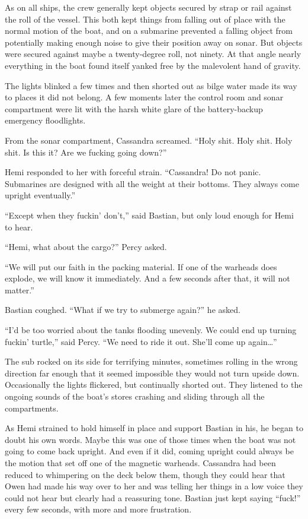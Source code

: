 \documentclass[
]{scrbook}
\begin{document}
As on all ships, the crew generally kept objects secured by strap or
rail against the roll of the vessel. This both kept things from falling
out of place with the normal motion of the boat, and on a submarine
prevented a falling object from potentially making enough noise to give
their position away on sonar. But objects were secured against maybe a
twenty-degree roll, not ninety. At that angle nearly everything in the
boat found itself yanked free by the malevolent hand of gravity.

The lights blinked a few times and then shorted out as bilge water made
its way to places it did not belong. A few moments later the control
room and sonar compartment were lit with the harsh white glare of the
battery-backup emergency floodlights.

From the sonar compartment, Cassandra screamed. ``Holy shit. Holy shit.
Holy shit. Is this it? Are we fucking going down?''

Hemi responded to her with forceful strain. ``Cassandra! Do not panic.
Submarines are designed with all the weight at their bottoms. They
always come upright eventually.''

``Except when they fuckin' don't,'' said Bastian, but only loud enough
for Hemi to hear.

``Hemi, what about the cargo?'' Percy asked.

``We will put our faith in the packing material. If one of the warheads
does explode, we will know it immediately. And a few seconds after that,
it will not matter.''

Bastian coughed. ``What if we try to submerge again?'' he asked.

``I'd be too worried about the tanks flooding unevenly. We could end up
turning fuckin' turtle,'' said Percy. ``We need to ride it out. She'll
come up again\ldots{}''

The sub rocked on its side for terrifying minutes, sometimes rolling in
the wrong direction far enough that it seemed impossible they would not
turn upside down. Occasionally the lights flickered, but continually
shorted out. They listened to the ongoing sounds of the boat's stores
crashing and sliding through all the compartments.

As Hemi strained to hold himself in place and support Bastian in his, he
began to doubt his own words. Maybe this was one of those times when the
boat was not going to come back upright. And even if it did, coming
upright could always be the motion that set off one of the magnetic
warheads. Cassandra had been reduced to whimpering on the deck below
them, though they could hear that Owen had made his way over to her and
was telling her things in a low voice they could not hear but clearly
had a reassuring tone. Bastian just kept saying ``fuck!'' every few
seconds, with more and more frustration.
\end{document}
